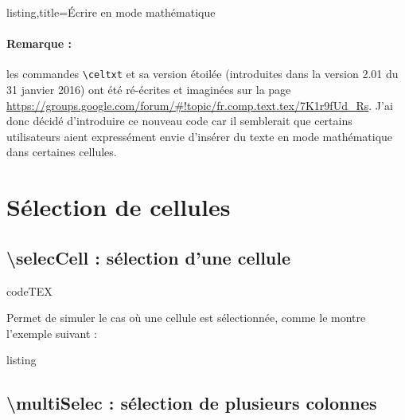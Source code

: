 \documentclass[a4paper,french]{article}
\begin{document}
\begin{tcblisting}{listing,title=\'Ecrire en mode math\'ematique}
\end{tcblisting}

\paragraph*{Remarque :} les commandes \texttt{\textbackslash celtxt} et sa version \'etoil\'ee (introduites dans la version 2.01 du 31 janvier 2016) ont \'et\'e r\'e-\'ecrites et imagin\'ees sur la page \url{https://groups.google.com/forum/#!topic/fr.comp.text.tex/7K1r9fUd_Rs}. J'ai donc d\'ecid\'e d'introduire ce nouveau code car il semblerait que certains utilisateurs aient express\'ement envie d'ins\'erer du texte en mode math\'ematique dans certaines cellules.

\section{S\'election de cellules}

\subsection{\textbackslash selecCell : s\'election d'une cellule}

\begin{tcblisting}{codeTEX}
\end{tcblisting}

\medskip

Permet de simuler le cas o\`u une cellule est s\'electionn\'ee, comme le montre l'exemple suivant :

\medskip

\begin{tcblisting}{listing}
\end{tcblisting}


\subsection{\textbackslash multiSelec : s\'election de plusieurs colonnes}
\end{document}
